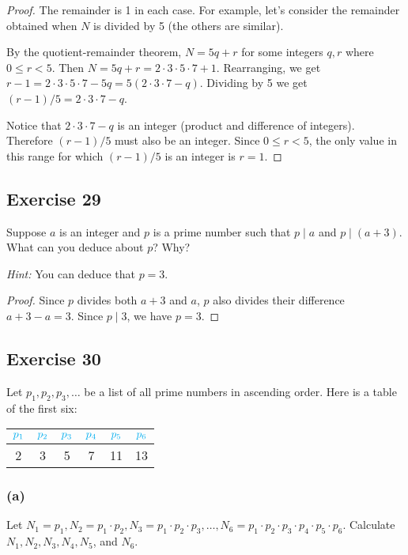 \documentclass[14pt]{extarticle}
\newcommand{\cy}{\color{cyan}}
\begin{document}
\begin{proof}
    The remainder is 1 in each case. For example, let's consider the remainder obtained when $N$ is divided by 5 (the others are similar).

    By the quotient-remainder theorem, $N = 5q+r$ for some integers $q,r$ where $0 \leq r < 5$. Then $N = 5q+r = 2\cdot3\cdot5\cdot7 + 1$. Rearranging, we get $r - 1 = 2\cdot3\cdot5\cdot7 - 5q = 5(2\cdot3\cdot7 - q)$. Dividing by 5 we get $(r-1)/5 = 2\cdot3\cdot7 - q$.

    Notice that $2\cdot3\cdot7 - q$ is an integer (product and difference of integers). Therefore $(r-1)/5$ must also be an integer. Since $0 \leq r < 5$, the only value in this range for which $(r-1)/5$ is an integer is $r = 1$.
\end{proof}

\subsection{Exercise 29}
Suppose $a$ is an integer and $p$ is a prime number such that $p \mid a$ and $p \mid (a + 3)$. What can you deduce
about $p$? Why?

{\it Hint:} You can deduce that $p = 3$.

\begin{proof}
    Since $p$ divides both $a+3$ and $a$, $p$ also divides their difference $a+3 - a = 3$. Since $p \mid 3$, we have $p = 3$.
\end{proof}

\subsection{Exercise 30}
Let $p_1, p_2, p_3, \ldots$ be a list of all prime numbers in ascending order. Here is a table of the first six:

\begin{center}
    \begin{tabular}{|c|c|c|c|c|c|}
        \hline
        $\cy p_1$ & $\cy p_2$ & $\cy p_3$ & $\cy p_4$ & $\cy p_5$ & $\cy p_6$ \\
        \hline
        2         & 3         & 5         & 7         & 11        & 13        \\
        \hline
    \end{tabular}
\end{center}

\subsubsection{(a)}
Let $N_1 = p_1, N_2 = p_1 \cdot p_2, N_3 = p_1 \cdot p_2 \cdot p_3, \ldots, N_6 = p_1 \cdot p_2 \cdot p_3 \cdot p_4 \cdot p_5 \cdot p_6$. Calculate $N_1, N_2, N_3, N_4, N_5$, and $N_6$.
\end{document}
